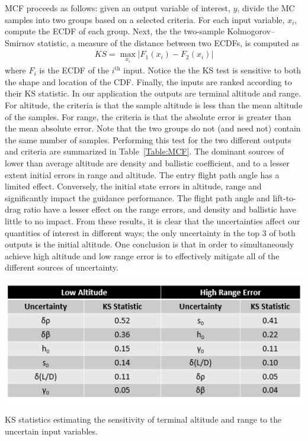 MCF proceeds as follows: given an output variable of interest, $y$, divide the MC samples into two groups based on a selected criteria. For each input variable, $x_i$, compute the ECDF of each group. Next, the the two-sample Kolmogorov–Smirnov statistic, a measure of the distance between two ECDFs, is computed as
 \begin{align}
	KS = \max_{x_i} | F_1(x_i) - F_2(x_i) | \label{Eq:KSTest}
\end{align}
where $F_i$ is the ECDF of the $i^{\mathrm{th}}$ input. Notice the the KS test is sensitive to both the shape and location of the CDF. Finally, the inputs are ranked according to their KS statistic. In our application the outputs are terminal altitude and range. For altitude, the criteria is that the sample altitude is less than the mean altitude of the samples. For range, the criteria is that the absolute error is greater than the mean absolute error. Note that the two groups do not (and need not) contain the same number of samples. Performing this test for the two different outputs and criteria are summarized in Table~\ref{Table:MCF}. The dominant sources of lower than average altitude are density and ballistic coefficient, and to a lesser extent initial errors in range and altitude. The entry flight path angle has a limited effect. Conversely, the initial state errors in altitude, range and significantly impact the guidance performance. The flight path angle and lift-to-drag ratio have a lesser effect on the range errors, and density and ballistic have little to no impact. From these results, it is clear that the uncertainties affect our quantities of interest in different ways; the only uncertainty in the top 3 of both outputs is the initial altitude. One conclusion is that in order to simultaneously achieve high altitude and low range error is to effectively mitigate all of the different sources of uncertainty. 
\begin{table}[h!]
	\centering
	\includegraphics[width=1\textwidth]{Images/MCFTable}
	\caption{KS statistics estimating the sensitivity of terminal altitude and range to the uncertain input variables.}
	\label{Table:MCF}
\end{table}

